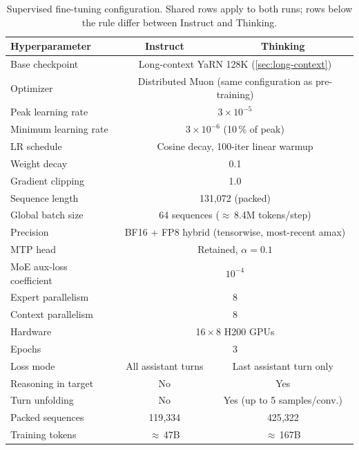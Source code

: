 \documentclass{llmxive}
\providecommand{\tableheadercolor}{}
\begin{document}
\begin{table}[!htbp]
  \centering
  \small
  \begin{tabular}{@{}lcc@{}}
    \toprule
    \tableheadercolor
    \textbf{Hyperparameter} & \textbf{Instruct} & \textbf{Thinking} \\
    \midrule
    Base checkpoint        & \multicolumn{2}{c}{Long-context YaRN 128K (\cref{sec:long-context})} \\
    Optimizer              & \multicolumn{2}{c}{Distributed Muon (same configuration as pre-training)} \\
    Peak learning rate     & \multicolumn{2}{c}{$3 \times 10^{-5}$} \\
    Minimum learning rate  & \multicolumn{2}{c}{$3 \times 10^{-6}$ (10\,\% of peak)} \\
    LR schedule            & \multicolumn{2}{c}{Cosine decay, 100-iter linear warmup} \\
    Weight decay           & \multicolumn{2}{c}{0.1} \\
    Gradient clipping      & \multicolumn{2}{c}{1.0} \\
    Sequence length        & \multicolumn{2}{c}{131{,}072 (packed)} \\
    Global batch size      & \multicolumn{2}{c}{64 sequences ($\approx$\,8.4M tokens/step)} \\
    Precision              & \multicolumn{2}{c}{BF16 + FP8 hybrid (tensorwise, most-recent amax)} \\
    MTP head               & \multicolumn{2}{c}{Retained, $\alpha = 0.1$} \\
    MoE aux-loss coefficient & \multicolumn{2}{c}{$10^{-4}$} \\
    Expert parallelism     & \multicolumn{2}{c}{8} \\
    Context parallelism    & \multicolumn{2}{c}{8} \\
    Hardware               & \multicolumn{2}{c}{16\,$\times$\,8 H200 GPUs} \\
    Epochs                 & \multicolumn{2}{c}{3} \\    
    \midrule
    Loss mode                 & All assistant turns & Last assistant turn only \\
    Reasoning in target       & No                  & Yes \\
    Turn unfolding            & No                  & Yes (up to 5 samples/conv.) \\
    Packed sequences          & 119{,}334           & 425{,}322 \\
    Training tokens           & $\approx$\,47B      & $\approx$\,167B \\
    \bottomrule
  \end{tabular}
\caption{Supervised fine-tuning configuration. Shared rows apply to both
  runs; rows below the rule differ between Instruct and Thinking.}
\label{tab:sft-hyperparams}
\end{table}
\end{document}
